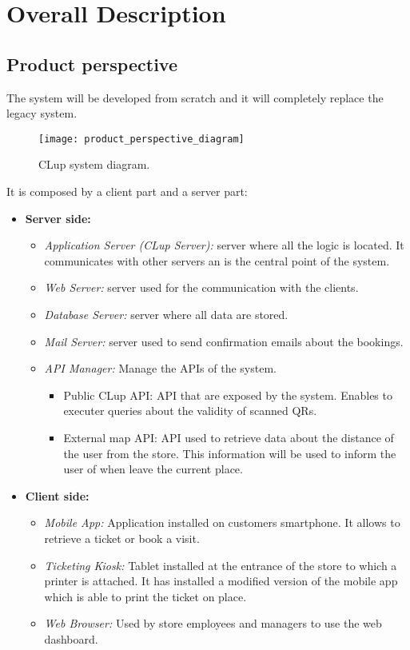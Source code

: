 \chapter{Overall Description}

\section{Product perspective}

The system will be developed from scratch and it will completely replace the legacy system. \newline

\vspace{0.8em}
\begin{figure}[H]
	\centering
	\texttt{[image: product\_perspective\_diagram]}
	\caption{CLup system diagram.}
\end{figure}

It is composed by a client part and a server part:
\begin{itemize}
	\item \textbf{Server side:}
	\begin{itemize}
		\item \textit{Application Server (CLup Server):} server where all the logic is located. It communicates with other servers an is the central point of the system.
		\item \textit{Web Server:} server used for the communication with the clients.
		\item \textit{Database Server:} server where all data are stored.
		\item \textit{Mail Server:} server used to send confirmation emails about the bookings.
		\item \textit{API Manager:} Manage the APIs of the system.
			\begin{itemize}
				\item Public CLup API: API that are exposed by the system. Enables to executer queries about the validity of scanned QRs.
				\item External map API: API used to retrieve data about the distance of the user from the store. This information will be used to inform the user of when leave the current place.
			\end{itemize}
	\end{itemize}
	\item \textbf{Client side:}
	\begin{itemize}
		\item \textit{Mobile App:} Application installed on customers smartphone. It allows to retrieve a ticket or book a visit.
		\item \textit{Ticketing Kiosk:} Tablet installed at the entrance of the store to which a printer is attached. It has installed a modified version of the mobile app which is able to print the ticket on place.
		\item \textit{Web Browser:} Used by store employees and managers to use the web dashboard.
	\end{itemize}
\end{itemize}

